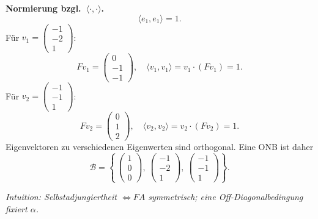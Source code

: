 \documentclass[11pt, a4paper]{article}
\begin{document}
\medskip
\textbf{Normierung bzgl.\ $\langle\cdot,\cdot\rangle$.}
\[
\langle e_1,e_1\rangle=1.
\]
Für $v_1=\begin{pmatrix}-1\\-2\\1\end{pmatrix}$:
\[
Fv_1=\begin{pmatrix}0\\-1\\-1\end{pmatrix},\quad
\langle v_1,v_1\rangle=v_1\cdot(Fv_1)=1.
\]
Für $v_2=\begin{pmatrix}-1\\-1\\1\end{pmatrix}$:
\[
Fv_2=\begin{pmatrix}0\\1\\2\end{pmatrix},\quad
\langle v_2,v_2\rangle=v_2\cdot(Fv_2)=1.
\]
Eigenvektoren zu verschiedenen Eigenwerten sind orthogonal. Eine ONB ist daher
\[
\mathcal{B}=\left\{\,\begin{pmatrix}1\\0\\0\end{pmatrix},\
\begin{pmatrix}-1\\-2\\1\end{pmatrix},\
\begin{pmatrix}-1\\-1\\1\end{pmatrix}\right\}.
\]

\medskip\noindent\textit{Intuition: Selbstadjungiertheit $\Leftrightarrow FA$ symmetrisch; eine Off-Diagonalbedingung fixiert $\alpha$.}
\end{document}
